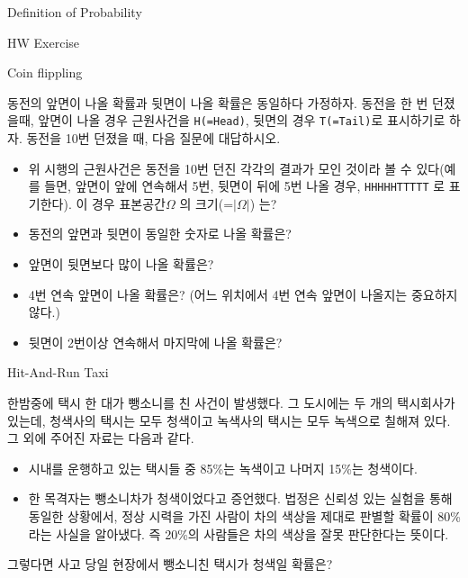 \begin{edXchapter}{Definition of Probability}

\begin{edXsection}{HW Exercise}

\begin{edXvertical}

\begin{edXproblem}{Coin flippling}

동전의 앞면이 나올 확률과 뒷면이 나올 확률은 동일하다 가정하자. 동전을 한 번 던졌을때,
앞면이 나올 경우 근원사건을 {\tt H(=Head)}, 뒷면의 경우 {\tt T(=Tail)}로 표시하기로 하자.
동전을 10번 던졌을 때, 다음 질문에 대답하시오.


\begin{itemize}
\item 위 시행의 근원사건은 동전을 10번 던진 각각의 결과가 모인 것이라 볼 수 있다(예를 들면, 앞면이 앞에 연속해서 5번, 뒷면이 뒤에 5번 나올 경우, {\tt HHHHHTTTTT} 로 표기한다).  
이 경우 표본공간$\Omega$ 의 크기(=$|\Omega|$) 는?
\item 동전의 앞면과 뒷면이 동일한 숫자로 나올 확률은?
\item 앞면이 뒷면보다 많이 나올 확률은?
\item 4번 연속 앞면이 나올 확률은? (어느 위치에서 4번 연속 앞면이 나올지는 중요하지 않다.) 
\item 뒷면이 2번이상 연속해서 마지막에 나올 확률은? 
\end{itemize}

\end{edXproblem}

\begin{edXproblem}{Hit-And-Run Taxi}

한밤중에 택시 한 대가 뺑소니를 친 사건이 발생했다. 그 도시에는 두 개의 택시회사가 있는데,
청색사의 택시는 모두 청색이고 녹색사의 택시는 모두 녹색으로 칠해져 있다. 그 외에 주어진 
자료는 다음과 같다.
\begin{itemize}
\item 시내를 운행하고 있는 택시들 중 85\%는 녹색이고 나머지 15\%는 청색이다.
\item 한 목격자는 뺑소니차가 청색이었다고 증언했다. 법정은 신뢰성 있는 실험을 통해 동일한 상황에서,
정상 시력을 가진 사람이 차의 색상을 제대로 판별할 확률이 80\%라는 사실을 알아냈다. 즉 20\%의
사람들은 차의 색상을 잘못 판단한다는 뜻이다.
\end{itemize}

그렇다면 사고 당일 현장에서 뺑소니친 택시가 청색일 확률은?
\end{edXproblem}

\end{edXvertical}
\end{edXsection}
\end{edXchapter}









